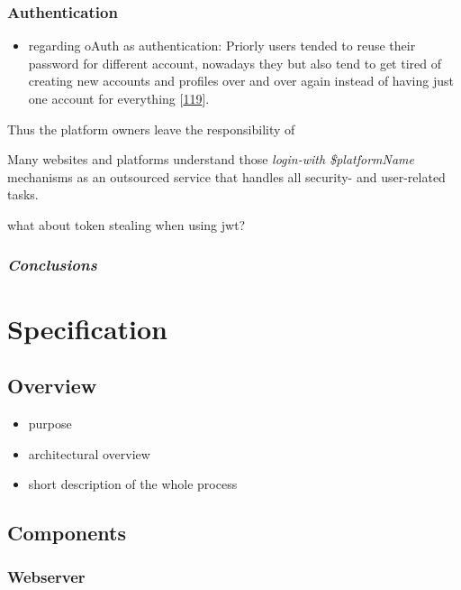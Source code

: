 \documentclass[12pt,english,a4paper,titlepage,cleardoublepage=empty,dottedtoc]{report}
\providecommand{\tightlist}{%
  \setlength{\itemsep}{0pt}\setlength{\parskip}{0pt}}
\begin{document}
\subsection{Authentication}\label{authentication-1}

\begin{itemize}
\tightlist
\item
  regarding oAuth as authentication: Priorly users tended to reuse their
  password for different account, nowadays they but also tend to get
  tired of creating new accounts and profiles over and over again
  instead of having just one account for everything
  {[}\protect\hyperlink{ref-web_2009-success-of-facebook-connect}{119}{]}.
\end{itemize}

Thus the platform owners leave the responsibility of

Many websites and platforms understand those \emph{login-with
\$platformName} mechanisms as an outsourced service that handles all
security- and user-related tasks.

what about token stealing when using jwt?

\subsection{\texorpdfstring{\emph{Conclusions}}{Conclusions}}\label{conclusions-2}

\chapter{Specification}\label{specification}

\section{Overview}\label{overview}

\begin{itemize}
\tightlist
\item
  purpose
\item
  architectural overview
\item
  short description of the whole process
\end{itemize}

\section{Components}\label{components-1}

\subsection{Webserver}\label{webserver}
\end{document}

